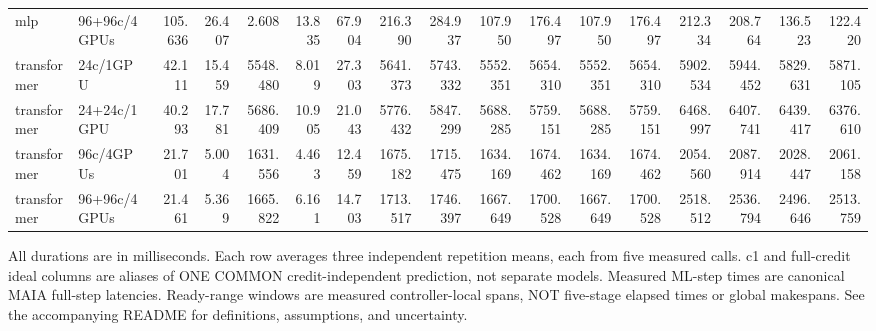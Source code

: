 \begin{landscape}
\begin{table}[p]
{\begin{tabular}{llrrrrrrrrrrrrrrr}
mlp & 96+96c/4GPUs & 105.636 & 26.407 & 2.608 & 13.835 & 67.904 & 216.390 & 284.937 & 107.950 & 176.497 & 107.950 & 176.497 & 212.334 & 208.764 & 136.523 & 122.420 \\
transformer & 24c/1GPU & 42.111 & 15.459 & 5548.480 & 8.019 & 27.303 & 5641.373 & 5743.332 & 5552.351 & 5654.310 & 5552.351 & 5654.310 & 5902.534 & 5944.452 & 5829.631 & 5871.105 \\
transformer & 24+24c/1GPU & 40.293 & 17.781 & 5686.409 & 10.905 & 21.043 & 5776.432 & 5847.299 & 5688.285 & 5759.151 & 5688.285 & 5759.151 & 6468.997 & 6407.741 & 6439.417 & 6376.610 \\
transformer & 96c/4GPUs & 21.701 & 5.004 & 1631.556 & 4.463 & 12.459 & 1675.182 & 1715.475 & 1634.169 & 1674.462 & 1634.169 & 1674.462 & 2054.560 & 2087.914 & 2028.447 & 2061.158 \\
transformer & 96+96c/4GPUs & 21.461 & 5.369 & 1665.822 & 6.161 & 14.703 & 1713.517 & 1746.397 & 1667.649 & 1700.528 & 1667.649 & 1700.528 & 2518.512 & 2536.794 & 2496.646 & 2513.759 \\
\bottomrule
\end{tabular}%
}
\par\smallskip
\begin{minipage}{\linewidth}\footnotesize
All durations are in milliseconds. Each row averages three independent
repetition means, each from five measured calls. c1 and full-credit ideal columns
are aliases of ONE COMMON credit-independent prediction, not separate models.
Measured ML-step times are canonical MAIA full-step latencies. Ready-range windows
are measured controller-local spans, NOT five-stage elapsed times or global
makespans. See the accompanying README for definitions, assumptions, and uncertainty.
\end{minipage}
\end{table}
\end{landscape}
